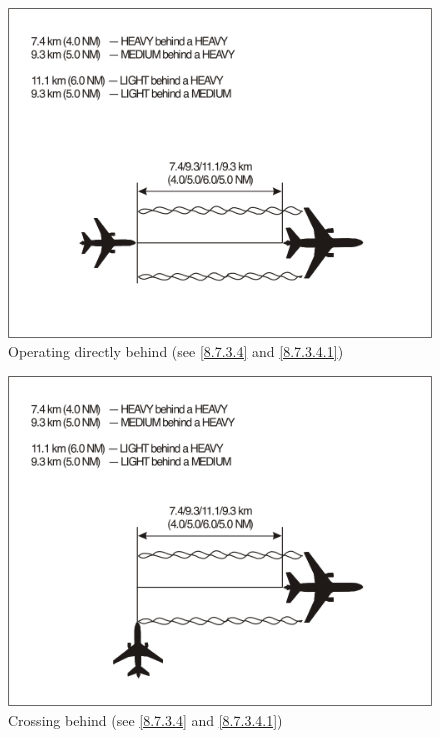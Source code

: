 \begin{enumerate}
\begin{enumerate}

        \vspace{0.5cm}
        \begin{figure}[!ht]
            \centering
            \includegraphics[width=13cm,keepaspectratio]{Images/Fig 8-1.png}
            \caption[Operating directly behind]{Operating directly behind (see \ref{8.7.3.4} and \ref{8.7.3.4.1})}
            \label{fig:8-1}
        \end{figure}

        \vfill
        \begin{figure}[!ht]
            \centering
            \includegraphics[width=13cm,keepaspectratio]{Images/Fig 8-2.png}
            \caption[Crossing behind]{Crossing behind (see \ref{8.7.3.4} and \ref{8.7.3.4.1})}
            \label{fig:8-2}
        \end{figure}
    \end{enumerate}
\end{enumerate}

